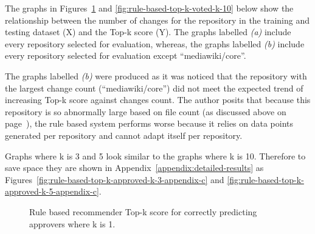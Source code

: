 The graphs in Figures~\ref{fig:rule-based-top-k-approved-k-1} and \ref{fig:rule-based-top-k-voted-k-10} below show the relationship between the number of changes for the repository in the training and testing dataset (X) and the Top-k score (Y). The graphs labelled \emph{(a)} include every repository selected for evaluation, whereas, the graphs labelled \emph{(b)} include every repository selected for evaluation except ``mediawiki/core''.

The graphs labelled \emph{(b)} were produced as it was noticed that the repository with the largest change count (``mediawiki/core'') did not meet the expected trend of increasing Top-k score against changes count. The author posits that because this repository is so abnormally large based on file count (as discussed above on page~\pageref{paragraph:mediawiki-core-being-large-in-file-count}), the rule based system performs worse because it relies on data points generated per repository and cannot adapt itself per repository.

Graphs where k is 3 and 5 look similar to the graphs where k is 10. Therefore to save space they are shown in Appendix~\ref{appendix:detailed-results} as Figures~\ref{fig:rule-based-top-k-approved-k-3-appendix-c} and \ref{fig:rule-based-top-k-approved-k-5-appendix-c}.

\begin{figure}[H]%
    \centering
    \caption{Rule based recommender Top-k score for correctly predicting approvers where k is 1.}%
    \label{fig:rule-based-top-k-approved-k-1}%
\end{figure}

